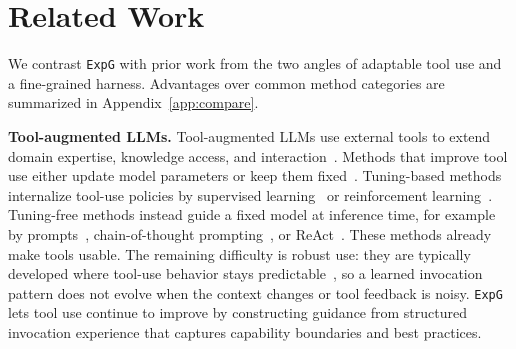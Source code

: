\documentclass[11pt]{article}
\newcommand{\ours}{\texttt{ExpG}}
\begin{document}
\section{Related Work}
We contrast {\ours} with prior work from the two angles of adaptable tool use and a fine-grained harness. Advantages over common method categories are summarized in Appendix~\ref{app:compare}.

\textbf{Tool-augmented LLMs.} 
Tool-augmented LLMs use external tools to extend domain expertise, knowledge access, and interaction~\cite{1,2,5,6,3,4}. Methods that improve tool use either update model parameters or keep them fixed~\cite{toolsurvey}.
Tuning-based methods internalize tool-use policies by supervised learning~\cite{11,12} or reinforcement learning~\cite{14,15}. Tuning-free methods instead guide a fixed model at inference time, for example by prompts~\cite{16}, chain-of-thought prompting~\cite{17}, or ReAct~\cite{13}. 
These methods already make tools usable. The remaining difficulty is robust use: they are typically developed where tool-use behavior stays predictable~\cite{10,8,7,9}, so a learned invocation pattern does not evolve when the context changes or tool feedback is noisy. 
{\ours} lets tool use continue to improve by constructing guidance from structured invocation experience that captures capability boundaries and best practices. 
\end{document}
